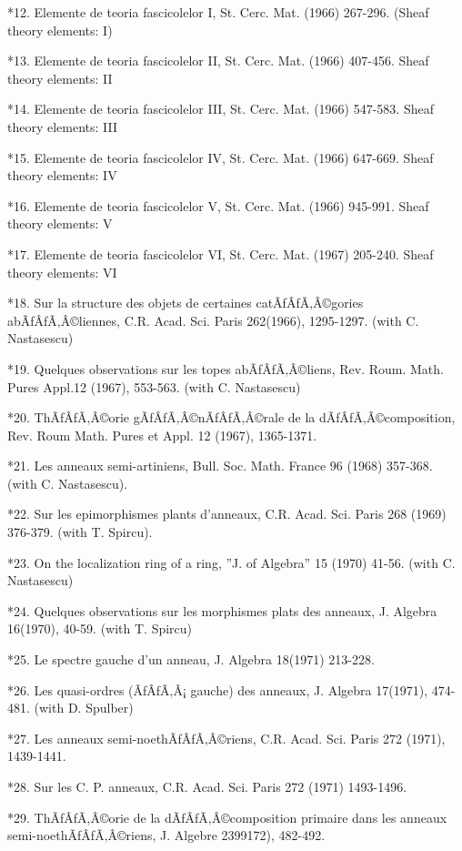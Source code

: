 \documentclass[12pt]{article}
\theoremstyle{plain}
\theoremstyle{definition}
\numberwithin{equation}{section}
\begin{document}
*12.    Elemente de teoria fascicolelor I, St. Cerc. Mat. (1966) 267-296. (Sheaf theory elements: I)

*13.    Elemente de teoria fascicolelor II, St. Cerc. Mat. (1966) 407-456. Sheaf theory elements: II

*14.    Elemente de teoria fascicolelor III, St. Cerc. Mat. (1966) 547-583. Sheaf theory elements: III

*15.    Elemente de teoria fascicolelor IV, St. Cerc. Mat. (1966) 647-669. Sheaf theory elements: IV

*16.    Elemente de teoria fascicolelor V, St. Cerc. Mat. (1966) 945-991. Sheaf theory elements: V

*17.    Elemente de teoria fascicolelor VI, St. Cerc. Mat. (1967) 205-240. Sheaf theory elements: VI

*18.    Sur la structure des objets de certaines catÃƒÂƒÃ‚Â©gories abÃƒÂƒÃ‚Â©liennes, C.R. Acad. Sci. Paris 262(1966), 1295-1297. (with C. Nastasescu) 

*19.    Quelques observations sur les topes abÃƒÂƒÃ‚Â©liens, Rev. Roum. Math. Pures Appl.12 (1967), 553-563. (with C. Nastasescu) 

*20.    ThÃƒÂƒÃ‚Â©orie gÃƒÂƒÃ‚Â©nÃƒÂƒÃ‚Â©rale de la dÃƒÂƒÃ‚Â©composition, Rev. Roum Math. Pures et Appl. 12 (1967), 1365-1371. 

*21.    Les anneaux semi-artiniens, Bull. Soc. Math. France 96 (1968) 357-368. (with C. Nastasescu). 

*22.    Sur les epimorphismes plants d'anneaux, C.R. Acad. Sci. Paris 268 (1969) 376-379. (with T. Spircu). 

*23.    On the localization ring of a ring, ''J. of Algebra'' 15 (1970) 41-56. (with C. Nastasescu)

*24.    Quelques observations sur les morphismes plats des anneaux, J. Algebra 16(1970), 40-59. (with T. Spircu)

*25.    Le spectre gauche d'un anneau, J. Algebra 18(1971) 213-228. 

*26.    Les quasi-ordres (ÃƒÂƒÃ‚Â¡ gauche) des anneaux, J. Algebra 17(1971), 474-481. (with D. Spulber) 

*27.    Les anneaux semi-noethÃƒÂƒÃ‚Â©riens, C.R. Acad. Sci. Paris 272 (1971), 1439-1441. 

*28.    Sur les C. P. anneaux, C.R. Acad. Sci. Paris 272 (1971) 1493-1496. 

*29.    ThÃƒÂƒÃ‚Â©orie de la dÃƒÂƒÃ‚Â©composition primaire dans les anneaux semi-noethÃƒÂƒÃ‚Â©riens, J. Algebre 2399172), 482-492. 
\end{document}
